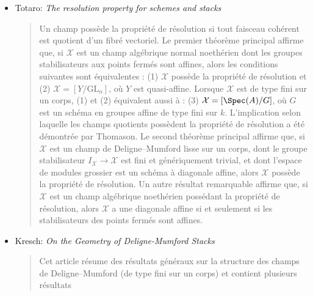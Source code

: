 \begin{itemize}
\begin{quote}
un sous-champ localement fermé
$V^0 \subset V$ tel que $V^0$ soit représentable et se projette surjectivement sur
$\mathcal{X}$. Ils
établissent qu'un champ algébrique est un champ quotient s'il existe un revêtement
fini et plat par un espace algébrique. Tout champ de Deligne--Mumford lisse à
stabilisateur génériquement trivial est un champ quotient.
Ils montrent qu'une gerbe en $\mathbf{G}_m$ sur un schéma noethérien $X$
correspondant à
$\beta \in H^2(X, \mathbf{G}_m)$ est un champ quotient si et seulement si $\beta$
appartient à
l'image de l'application de Brauer $\text{Br}(X) \to \text{Br}'(X)$. Ils en déduisent
un exemple de
champ de Deligne--Mumford non séparé qui n'est pas un champ quotient.
\end{quote}
\item Totaro: \emph{The resolution property for schemes and stacks}
\cite{totaro_resolution}
\begin{quote}
Un champ possède la propriété de résolution si tout faisceau cohérent est quotient
d'un fibré vectoriel. Le premier théorème principal affirme que, si $\mathcal{X}$ est
un champ algébrique normal noethérien dont les groupes stabilisateurs aux points
fermés sont affines, alors les conditions suivantes sont équivalentes : (1)
$\mathcal{X}$ possède la propriété de résolution et
(2)
$\mathcal{X} = [Y/\text{GL}_n]$, où $Y$ est quasi-affine. Lorsque
$\mathcal{X}$ est de type fini sur
un corps, (1) et (2) équivalent aussi à : (3)
$\mathcal{X} = [\Spec(A)/G]$, où $G$ est
un schéma en groupes affine de type fini sur $k$. L'implication selon laquelle les
champs quotients possèdent la propriété de résolution a été démontrée par Thomason.
Le second théorème principal affirme que, si $\mathcal{X}$ est un champ de
Deligne--Mumford lisse sur
un corps, dont le groupe stabilisateur $I_\mathcal{X}
\to \mathcal{X}$ est fini et génériquement trivial, et dont l'espace de modules
grossier est un schéma à diagonale affine, alors
$\mathcal{X}$ possède la propriété de résolution. Un autre résultat remarquable
affirme que, si $\mathcal{X}$ est
un champ algébrique noethérien possédant la propriété de résolution, alors
$\mathcal{X}$ a
une diagonale affine si et seulement si les stabilisateurs des points fermés sont affines.
\end{quote}
\item Kresch: \emph{On the Geometry of Deligne-Mumford Stacks}
\cite{kresch_geometry}
\begin{quote}
Cet article résume des résultats généraux sur la structure des champs de
Deligne--Mumford (de type fini sur un corps) et contient plusieurs résultats

\end{quote}
\end{itemize}
